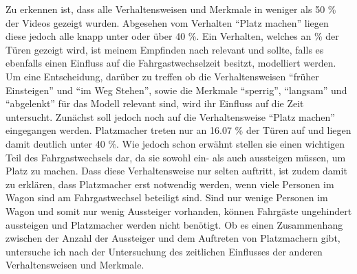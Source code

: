 Zu erkennen ist, dass alle Verhaltensweisen und Merkmale in weniger als 50 \% der Videos gezeigt wurden. Abgesehen vom Verhalten "`Platz machen"' liegen diese jedoch alle knapp unter oder über 40 \%. Ein Verhalten, welches an  \% der Türen gezeigt wird, ist meinem Empfinden nach relevant und sollte, falls es ebenfalls einen Einfluss auf die Fahrgastwechselzeit besitzt, modelliert werden. Um eine Entscheidung, darüber zu treffen ob die Verhaltensweisen "`früher Einsteigen"' und "`im Weg Stehen"', sowie die Merkmale "`sperrig"', "`langsam"' und "`abgelenkt"' für das Modell relevant sind, wird ihr Einfluss auf die Zeit untersucht. Zunächst soll jedoch noch auf die Verhaltensweise "`Platz machen"' eingegangen werden. Platzmacher treten nur an 16.07 \% der Türen auf und liegen damit deutlich unter 40 \%. Wie jedoch schon erwähnt stellen sie einen wichtigen Teil des Fahrgastwechsels dar, da sie sowohl ein- als auch aussteigen müssen, um Platz zu machen. Dass diese Verhaltensweise nur selten auftritt, ist zudem damit zu erklären, dass Platzmacher erst notwendig werden, wenn viele Personen im Wagon sind \bzw am Fahrgastwechsel beteiligt sind. Sind nur wenige Personen im Wagon und somit nur wenig Aussteiger vorhanden, können Fahrgäste ungehindert aussteigen und Platzmacher werden nicht benötigt. Ob es einen Zusammenhang zwischen der Anzahl der Aussteiger und dem Auftreten von Platzmachern gibt, untersuche ich nach der Untersuchung des zeitlichen Einflusses der anderen Verhaltensweisen und Merkmale.

